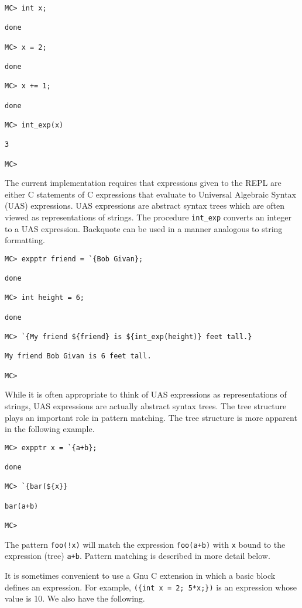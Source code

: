 \documentclass{article}
\begin{document}
\begin{verbatim}
MC> int x;

done

MC> x = 2;

done

MC> x += 1;

done

MC> int_exp(x)

3

MC>
\end{verbatim}

The current implementation requires that expressions given to the REPL are either C statements of C expressions that evaluate to Universal Algebraic Syntax (UAS) expressions.
UAS expressions are abstract syntax trees which are often viewed as representations of strings. The procedure {\tt int\_exp}
converts an integer to a UAS expression.
Backquote can be used in a manner analogous to string formatting.

\begin{verbatim}
MC> expptr friend = `{Bob Givan};

done

MC> int height = 6;

done

MC> `{My friend ${friend} is ${int_exp(height)} feet tall.}

My friend Bob Givan is 6 feet tall.

MC> 
\end{verbatim}

While it is often appropriate to think of UAS expressions as representations of strings, UAS expressions are actually abstract syntax trees. The tree structure
plays an important role in pattern matching. The tree structure is more apparent in the following example.

\begin{verbatim}
MC> expptr x = `{a+b};

done

MC> `{bar(${x}}

bar(a+b)

MC>
\end{verbatim}

The pattern {\tt foo(!x)} will match the expression {\tt foo(a+b)} with {\tt x} bound to the expression (tree) {\tt a+b}.
Pattern matching is described in more detail below.

It is sometimes convenient to use a Gnu C extension in which a basic block defines an expression.  For example,
{\tt (\{int x = 2; 5*x;\})} is an expression whose value is 10.  We also have the following.
\end{document}
